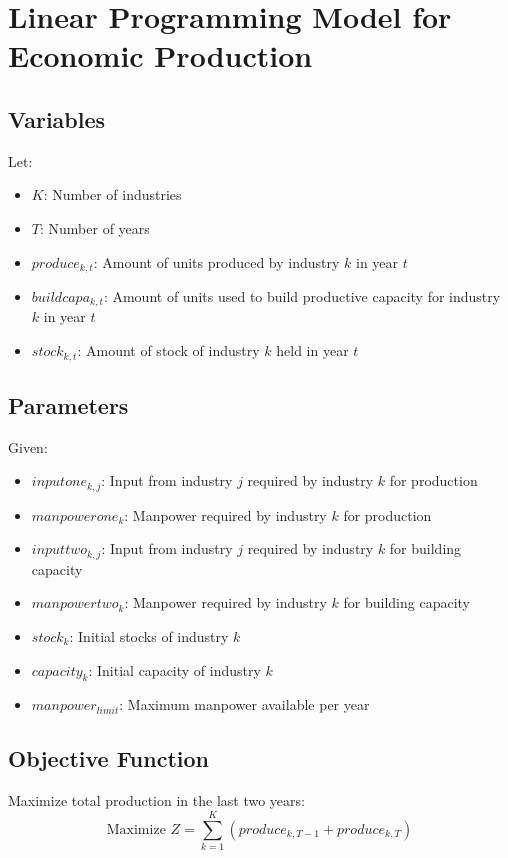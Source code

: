 \documentclass{article}
\begin{document}
\section*{Linear Programming Model for Economic Production}

\subsection*{Variables}
Let:
\begin{itemize}
    \item $K$: Number of industries
    \item $T$: Number of years
    \item $produce_{k, t}$: Amount of units produced by industry $k$ in year $t$
    \item $buildcapa_{k, t}$: Amount of units used to build productive capacity for industry $k$ in year $t$
    \item $stock_{k, t}$: Amount of stock of industry $k$ held in year $t$
\end{itemize}

\subsection*{Parameters}
Given:
\begin{itemize}
    \item $inputone_{k,j}$: Input from industry $j$ required by industry $k$ for production
    \item $manpowerone_{k}$: Manpower required by industry $k$ for production
    \item $inputtwo_{k,j}$: Input from industry $j$ required by industry $k$ for building capacity
    \item $manpowertwo_{k}$: Manpower required by industry $k$ for building capacity
    \item $stock_{k}$: Initial stocks of industry $k$
    \item $capacity_{k}$: Initial capacity of industry $k$
    \item $manpower_{limit}$: Maximum manpower available per year
\end{itemize}

\subsection*{Objective Function}
Maximize total production in the last two years:
\[
\text{Maximize } Z = \sum_{k=1}^{K} \left( produce_{k, T-1} + produce_{k, T} \right)
\]
\end{document}
